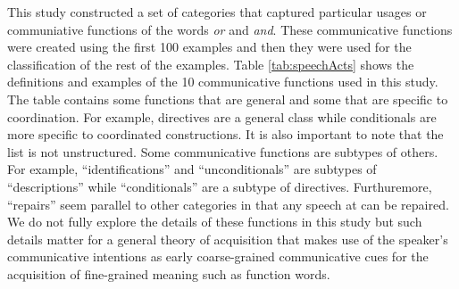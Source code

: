 \documentclass[oneside]{report}
\theoremstyle{definition}
\theoremstyle{definition}
\theoremstyle{definition}
\theoremstyle{remark}
\begin{document}
This study constructed a set of categories that captured particular
usages or communiative functions of the words \emph{or} and \emph{and}.
These communicative functions were created using the first 100 examples
and then they were used for the classification of the rest of the
examples. Table \ref{tab:speechActs} shows the definitions and examples
of the 10 communicative functions used in this study. The table contains
some functions that are general and some that are specific to
coordination. For example, directives are a general class while
conditionals are more specific to coordinated constructions. It is also
important to note that the list is not unstructured. Some communicative
functions are subtypes of others. For example, ``identifications'' and
``unconditionals'' are subtypes of ``descriptions'' while
``conditionals'' are a subtype of directives. Furthuremore, ``repairs''
seem parallel to other categories in that any speech at can be repaired.
We do not fully explore the details of these functions in this study but
such details matter for a general theory of acquisition that makes use
of the speaker's communicative intentions as early coarse-grained
communicative cues for the acquisition of fine-grained meaning such as
function words.
\end{document}
